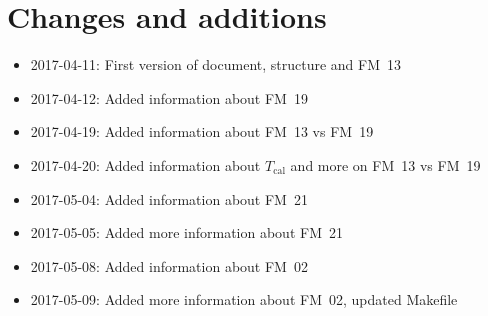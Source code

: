 \chapter{Changes and additions}
\label{ch:changes}

\begin{itemize}
    \item 2017-04-11: First version of document, structure and FM~13
    \item 2017-04-12: Added information about FM~19
    \item 2017-04-19: Added information about FM~13 vs FM~19
    \item 2017-04-20: Added information about $T_\mathrm{cal}$
                      and more on FM~13 vs FM~19
    \item 2017-05-04: Added information about FM~21
    \item 2017-05-05: Added more information about FM~21
    \item 2017-05-08: Added information about FM~02
    \item 2017-05-09: Added more information about FM~02, updated Makefile
\end{itemize}

